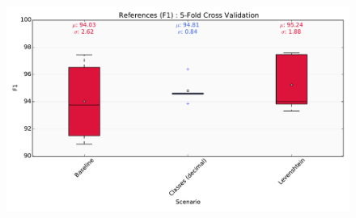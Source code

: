 \begin{figure}[h]
\center
\includegraphics[width=5.5in]{Figures/references.pdf}
\caption{}
\label{fig:references}
\end{figure}

